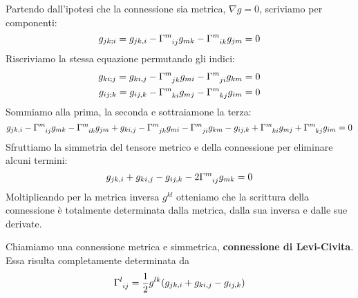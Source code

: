 Partendo dall'ipotesi che la connessione sia metrica, $\nabla g =0$, scriviamo per componenti:
\begin{equation*}
    g_{jk;i}=g_{jk,i} -\tensor{\Gamma}{^m_{ij}} g_{mk} - \tensor{\Gamma}{^m_{ik}} g_{jm} = 0
\end{equation*}
Riscriviamo la stessa equazione permutando gli indici:
\begin{align*}
    g_{ki;j}=g_{ki,j} -\tensor{\Gamma}{^m_{jk}} g_{mi} - \tensor{\Gamma}{^m_{ji}} g_{km} = 0 \\
    g_{ij;k}=g_{ij,k} -\tensor{\Gamma}{^m_{ki}} g_{mj} - \tensor{\Gamma}{^m_{kj}} g_{im} = 0
\end{align*}
Sommiamo alla prima, la seconda e sottraiamone la terza:
\begin{equation*}
    g_{jk,i} -\tensor{\Gamma}{^m_{ij}} g_{mk} - \tensor{\Gamma}{^m_{ik}} g_{jm} + g_{ki,j} -\tensor{\Gamma}{^m_{jk}} g_{mi} - \tensor{\Gamma}{^m_{ji}} g_{km} - g_{ij,k} +\tensor{\Gamma}{^m_{ki}} g_{mj} + \tensor{\Gamma}{^m_{kj}} g_{im} = 0
\end{equation*}
Sfruttiamo la simmetria del tensore metrico e della connessione per eliminare alcuni termini:
\begin{equation*}
    g_{jk,i} + g_{ki,j} - g_{ij,k} -2\tensor{\Gamma}{^m_{ij}} g_{mk} = 0
\end{equation*}
Moltiplicando per la metrica inversa $g^{kl}$ otteniamo che la scrittura della connessione è totalmente determinata dalla metrica, dalla sua inversa e dalle sue derivate.
\begin{definizione}
Chiamiamo una connessione metrica e simmetrica, \textbf{connessione di Levi-Civita}. Essa risulta completamente determinata da
\begin{equation}
   \tensor{\Gamma}{^l_{ij}} = \frac{1}{2}g^{lk}( g_{jk,i} + g_{ki,j} - g_{ij,k} )
\label{eq.connlevicivita}
\end{equation}
\end{definizione}


